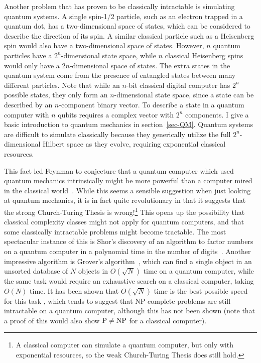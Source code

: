 \documentclass{report}
\begin{document}
Another problem that has proven to be classically intractable is simulating 
quantum systems.  A single spin-1/2 particle, such as an electron trapped 
in a quantum dot, has a two-dimensional space of states, which can be 
considered to describe the direction of its spin.  A similar classical particle 
such as a Heisenberg spin would also have a two-dimensional space of states.  
However, $n$ quantum particles have a $2^n$-dimensional state space, while 
$n$ classical Heisenberg spins would only have a $2n$-dimensional space of 
states.  The extra states in the quantum system come from the presence of 
entangled states between many different particles.  Note that while an $n$-bit
classical digital computer has $2^n$ possible states, they only form an 
$n$-dimensional state space, since a state can be described by an $n$-component
binary vector.  To describe a state in a quantum computer with $n$ qubits 
requires a complex vector with $2^n$ components.  I give a basic introduction 
to quantum mechanics in section~\ref{sec-QM}.  Quantum systems are difficult 
to simulate classically because they generically utilize the full 
$2^n$-dimensional Hilbert space as they evolve, requiring exponential 
classical resources.

This fact led Feynman to conjecture that a quantum computer which used 
quantum mechanics intrinsically might be more powerful than a computer 
mired in the classical world~\cite{feynman}.  While this seems a sensible 
suggestion when just looking at quantum mechanics, it is in fact quite 
revolutionary in that it suggests that the strong Church-Turing Thesis is 
wrong!\footnote{A classical computer can simulate a quantum computer, but
only with exponential resources, so the weak Church-Turing Thesis does still
hold.}  This opens up the possibility that classical complexity classes might 
not apply for quantum computers, and that some classically intractable problems 
might become tractable.  The most spectacular instance of this is Shor's 
discovery of an algorithm to factor numbers on a quantum computer in a 
polynomial time in the number of digits~\cite{shor-factoring}.  Another 
impressive algorithm is Grover's algorithm~\cite{grover}, which can find a 
single object in an unsorted database of $N$ objects in $O(\sqrt{N})$ time 
on a quantum computer, while the same task would require an exhaustive 
search on a classical computer, taking $O(N)$ time.  It has been shown
that $O(\sqrt{N})$ time is the best possible speed for this task
\cite{bennett-strengths}, which tends to suggest that NP-complete problems
are still intractable on a quantum computer, although this has not been
shown (note that a proof of this would also show ${\rm P} \neq {\rm NP}$ for a 
classical computer).
\end{document}
